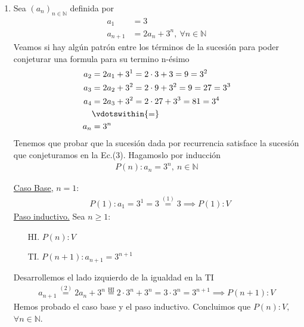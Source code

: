 \begin{enumerate}[label=\roman*)]
    \item Sea $(a_n)_{n \in \mathbb{N}}$ definida por
    \setcounter{equation}{0}
    \begin{align}
        a_1 &= 3 \\
        a_{n+1} &= 2 a_n + 3^n,\ \forall n \in \mathbb{N}
    \end{align}
    Veamos si hay algún patrón entre los términos de la sucesión para poder conjeturar una formula para su termino 
    n-ésimo
    \begin{align*}
        a_2 &= 2 a_1 + 3^1 = 2 \cdot 3 + 3 = 9 = 3^2 \\
        a_3 &= 2 a_2 + 3^2 = 2 \cdot 9 + 3^2 = 9  = 27 = 3^3\\
        a_4 &= 2 a_3 + 3^2 = 2 \cdot 27 + 3^3  = 81 = 3^4\\
        &\vdotswithin{=} \\
        a_n &= 3^n
    \end{align*}
    Tenemos que probar que la sucesión dada por recurrencia satisface la sucesión que conjeturamos en la Ec.(3). 
    Hagamoslo por inducción
    \begin{align*}
        P(n): a_n = 3^n, \ n \in \mathbb{N}
    \end{align*}
    
    \underline{Caso Base}, $n = 1$:
	    \begin{align*}
		    &P(1): a_1 = 3^1 = 3 \overset{(1)}{=} 3 \implies P(1):V
	    \end{align*}
	\underline{Paso inductivo.} Sea $n \geq 1$:
	\begin{enumerate}
        \item[HI.] $P(n): V$
        \item[TI.] $P(n+1): a_{n+1} = 3^{n+1}$
    \end{enumerate}
 	Desarrollemos el lado izquierdo de la igualdad en la TI
    \begin{align*}
  	    a_{n+1} \overset{(2)}{=} 2 a_n + 3^n \overset{\text{HI}}{=} 2 \cdot 3^n + 3^n = 3 \cdot 3^n = 3^{n+1} 
        \implies P(n+1):V
    \end{align*}
    Hemos probado el caso base y el paso inductivo. Concluimos que $P(n):V,$ $\forall n \in \mathbb{N}$.


\end{enumerate}
